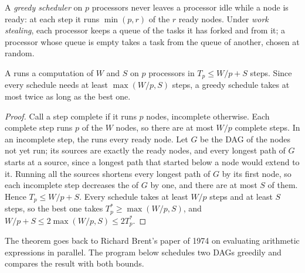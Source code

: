 \begin{definition}\label{def:b3:parallel-programming:scheduler}
A \emph{greedy scheduler} on $p$ processors never leaves a processor idle while a node is ready: at each step it runs $\min(p, r)$ of the $r$ ready nodes. Under \emph{work stealing}, each processor keeps a queue of the tasks it has forked and  from it; a processor whose queue is empty takes a task from the queue of another, chosen at random.
\end{definition}

\begin{theorem}\label{thm:b3:parallel-programming:brent}
A  runs a computation of  $W$ and  $S$ on $p$ processors in $T_p \le W/p + S$ steps. Since every schedule needs at least $\max(W/p, S)$ steps, a greedy schedule takes at most twice as long as the best one.
\end{theorem}

\begin{proof}
Call a step complete if it runs $p$ nodes, incomplete otherwise. Each complete step runs $p$ of the $W$ nodes, so there are at most $W/p$ complete steps. In an incomplete step, the  runs every ready node. Let $G$ be the DAG of the nodes not yet run; its sources are exactly the ready nodes, and every longest path of $G$ starts at a source, since a longest path that started below a node would extend to it. Running all the sources shortens every longest path of $G$ by its first node, so each incomplete step decreases the  of $G$ by one, and there are at most $S$ of them. Hence $T_p \le W/p + S$. Every schedule takes at least $W/p$ steps and at least $S$ steps, so the best one takes $T^*_p \ge \max(W/p, S)$, and $W/p + S \le 2\max(W/p, S) \le 2T^*_p$.
\end{proof}

The theorem goes back to Richard Brent's paper of 1974 on evaluating arithmetic expressions in parallel. %
The program below schedules two DAGs greedily and compares the result with both bounds.

\label{lst:b3:parallel-programming:brent}

